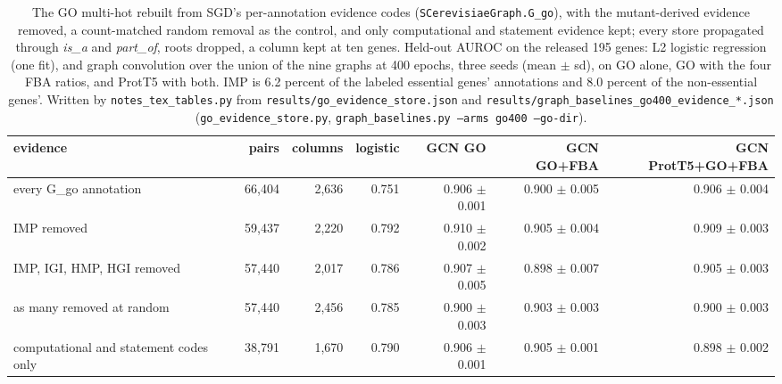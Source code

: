\begin{table}[H]
  \centering
  \footnotesize
  \caption[GO cut by evidence code]{The GO multi-hot rebuilt from SGD's per-annotation evidence codes (\texttt{SCerevisiaeGraph.G\_go}), with the mutant-derived evidence removed, a count-matched random removal as the control, and only computational and statement evidence kept; every store propagated through \emph{is\_a} and \emph{part\_of}, roots dropped, a column kept at ten genes. Held-out AUROC on the released 195 genes: L2 logistic regression (one fit), and graph convolution over the union of the nine graphs at 400 epochs, three seeds (mean $\pm$ sd), on GO alone, GO with the four FBA ratios, and ProtT5 with both. IMP is 6.2 percent of the labeled essential genes' annotations and 8.0 percent of the non-essential genes'. Written by \texttt{notes\_tex\_tables.py} from \texttt{results/go\_evidence\_store.json} and \texttt{results/graph\_baselines\_go400\_evidence\_*.json} (\texttt{go\_evidence\_store.py}, \texttt{graph\_baselines.py --arms go400 --go-dir}).}
  \label{tab:go-evidence}
  \begin{tabular}{@{}lrrrrrr@{}}
    \hline
    evidence & pairs & columns & logistic & GCN GO & GCN GO+FBA & GCN ProtT5+GO+FBA \\
    \hline
    every G\_go annotation & 66,404 & 2,636 & 0.751 & 0.906 $\pm$ 0.001 & 0.900 $\pm$ 0.005 & 0.906 $\pm$ 0.004 \\
    IMP removed & 59,437 & 2,220 & 0.792 & 0.910 $\pm$ 0.002 & 0.905 $\pm$ 0.004 & 0.909 $\pm$ 0.003 \\
    IMP, IGI, HMP, HGI removed & 57,440 & 2,017 & 0.786 & 0.907 $\pm$ 0.005 & 0.898 $\pm$ 0.007 & 0.905 $\pm$ 0.003 \\
    as many removed at random & 57,440 & 2,456 & 0.785 & 0.900 $\pm$ 0.003 & 0.903 $\pm$ 0.003 & 0.900 $\pm$ 0.003 \\
    computational and statement codes only & 38,791 & 1,670 & 0.790 & 0.906 $\pm$ 0.001 & 0.905 $\pm$ 0.001 & 0.898 $\pm$ 0.002 \\
    \hline
  \end{tabular}
\end{table}
